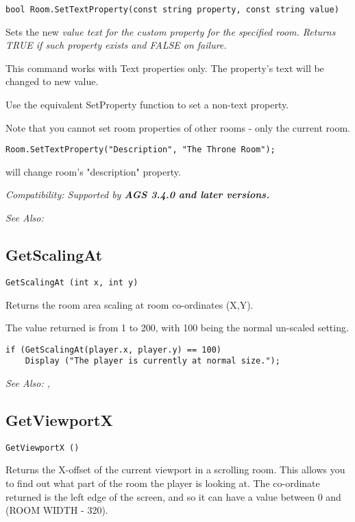 \begin{verbatim}
bool Room.SetTextProperty(const string property, const string value)
\end{verbatim}
Sets the new \it{value} text for the custom \it{property} for the specified room. Returns
TRUE if such property exists and FALSE on failure.

This command works with Text properties only. The property's text will be
changed to new value.

Use the equivalent SetProperty function to set a non-text property.

Note that you cannot set room properties of other rooms - only the current room.

\begin{verbatim}
Room.SetTextProperty("Description", "The Throne Room");
\end{verbatim}
will change room's "description" property.

\it{Compatibility:} Supported by \bf{AGS 3.4.0} and later versions.

\it{See Also:} 


\subsection{GetScalingAt}\label{GetScalingAt}%

\begin{verbatim}
GetScalingAt (int x, int y)
\end{verbatim}
Returns the room area scaling at room co-ordinates (X,Y).

The value returned is from 1 to 200, with 100 being the normal un-scaled setting.

\begin{verbatim}
if (GetScalingAt(player.x, player.y) == 100)
    Display ("The player is currently at normal size.");
\end{verbatim}

\it{See Also:} , 



\subsection{GetViewportX}\label{GetViewportX}%

\begin{verbatim}
GetViewportX ()
\end{verbatim}
Returns the X-offset of the current viewport in a scrolling room. This
allows you to find out what part of the room the player is looking at.
The co-ordinate returned is the left edge of the screen, and so it can
have a value between 0 and (ROOM WIDTH - 320).

